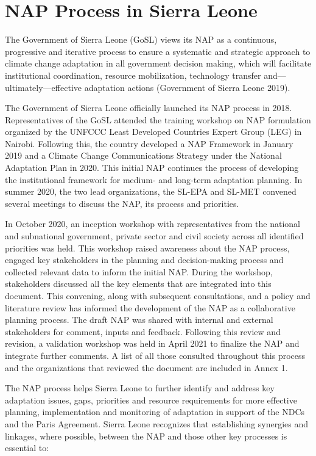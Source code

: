 \documentclass[
]{book}
\begin{document}
\hypertarget{nap-process-in-sierra-leone}{%
\section{NAP Process in Sierra Leone}\label{nap-process-in-sierra-leone}}

The Government of Sierra Leone (GoSL) views its NAP as a continuous, progressive and iterative process to ensure a systematic and strategic approach to climate change adaptation in all government decision making, which will facilitate institutional coordination, resource mobilization, technology transfer and---ultimately---effective adaptation actions (Government of Sierra Leone 2019).

The Government of Sierra Leone officially launched its NAP process in 2018. Representatives of the GoSL attended the training workshop on NAP formulation organized by the UNFCCC Least Developed Countries Expert Group (LEG) in Nairobi. Following this, the country developed a NAP Framework in January 2019 and a Climate Change Communications Strategy under the National Adaptation Plan in 2020. This initial NAP continues the process of developing the institutional framework for medium- and long-term adaptation planning. In summer 2020, the two lead organizations, the SL-EPA and SL-MET convened several meetings to discuss the NAP, its process and priorities.

In October 2020, an inception workshop with representatives from the national and subnational government, private sector and civil society across all identified priorities was held. This workshop raised awareness about the NAP process, engaged key stakeholders in the planning and decision-making process and collected relevant data to inform the initial NAP. During the workshop, stakeholders discussed all the key elements that are integrated into this document. This convening, along with subsequent consultations, and a policy and literature review has informed the development of the NAP as a collaborative planning process. The draft NAP was shared with internal and external stakeholders for comment, inputs and feedback. Following this review and revision, a validation workshop was held in April 2021 to finalize the NAP and integrate further comments. A list of all those consulted throughout this process and the organizations that reviewed the document are included in Annex 1.

The NAP process helps Sierra Leone to further identify and address key adaptation issues, gaps, priorities and resource requirements for more effective planning, implementation and monitoring of adaptation in support of the NDCs and the Paris Agreement. Sierra Leone recognizes that establishing synergies and linkages, where possible, between the NAP and those other key processes is essential to:
\end{document}

